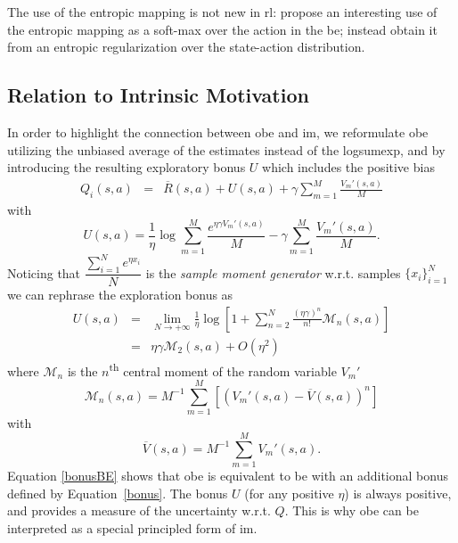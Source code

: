 The use of the entropic mapping is not new in \gls{rl}: \cite{pmlr-v70-asadi17a} propose an interesting use of the entropic mapping as a soft-max over the action in the \gls{be}; \cite{peters2010relative} instead obtain it from an entropic regularization over the state-action distribution.

\subsection{Relation to Intrinsic Motivation}
In order to highlight the connection between \gls{obe} and \gls{im}, we reformulate \gls{obe} utilizing the unbiased average of the estimates instead of the logsumexp, and by introducing the resulting exploratory bonus $U$ which includes the positive bias
\begin{eqnarray}
Q_i(s,a)\! &=&\! \overline{R}(s,a) + U(s,a) +  \gamma  \sum_{m=1}^M \frac{V_m'(s,a)}{M} \label{bonusBE}
\end{eqnarray}
with
\begin{equation}
U(s,a) \! =\!  \frac{1}{\eta}\log\sum_{m=1}^M \frac{e^{\eta\gamma V_m'(s,a)}}{M} - \gamma  \sum_{m=1}^M \frac{V_m'(s,a)}{M}. \label{bonusdef}
\end{equation}
Noticing that $\dfrac{\sum_{i=1}^N e^{\eta x_i}}{N}$ is the \textit{sample moment generator} w.r.t. samples $\{x_i\}_{i=1}^N$ we can rephrase the exploration bonus as
\begin{eqnarray}
U(s,a)& = & \lim_{N \to +\infty}\frac{1}{\eta} \log [  1 + \sum_{n=2}^{N} \frac{(\eta\gamma)^n}{n!}\mathcal{M}_n(s,a)] \nonumber \\
& = & \eta \gamma \mathcal{M}_2(s,a)  + O(\eta^2)\label{bonus}
\end{eqnarray}
where $\mathcal{M}_n$ is the $n$\textsuperscript{th} central moment of the random variable $V_m'$
\begin{equation}
\mathcal{M}_n(s,a) = M^{-1} \sum_{m=1}^M [( V_m'(s,a) -\overline{V}(s,a))^n]\nonumber
\end{equation}
with 
\begin{equation}
\overline{V}(s,a) = M^{-1} \sum_{m=1}^M V_m'(s,a).\nonumber
\end{equation}
Equation \eqref{bonusBE} shows that \gls{obe} is equivalent to \gls{be} with an additional bonus defined by Equation~\ref{bonus}. The bonus $U$ (for any positive $\eta$) is always positive, and provides a measure of the uncertainty w.r.t. $Q$. This is why \gls{obe} can be interpreted as a special principled form of \gls{im}.

